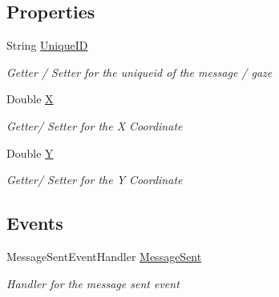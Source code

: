\subsection*{Properties}
\begin{DoxyCompactItemize}
\item 
String \hyperlink{class_web_analyzer_1_1_models_1_1_message_model_1_1_small_data_message_a8ad38d3f87324484d4d9a6ed62656e70}{Unique\+I\+D}
\begin{DoxyCompactList}\small\item\em Getter / Setter for the uniqueid of the message / gaze \end{DoxyCompactList}\item 
Double \hyperlink{class_web_analyzer_1_1_models_1_1_message_model_1_1_small_data_message_a26dce64be8d77b383253876ae2bbd06d}{X}
\begin{DoxyCompactList}\small\item\em Getter/ Setter for the X Coordinate \end{DoxyCompactList}\item 
Double \hyperlink{class_web_analyzer_1_1_models_1_1_message_model_1_1_small_data_message_a4214bf4d6c2c88448e32472cc14f41cd}{Y}
\begin{DoxyCompactList}\small\item\em Getter/ Setter for the Y Coordinate \end{DoxyCompactList}\end{DoxyCompactItemize}
\subsection*{Events}
\begin{DoxyCompactItemize}
\item 
Message\+Sent\+Event\+Handler \hyperlink{class_web_analyzer_1_1_models_1_1_message_model_1_1_small_data_message_a818b24f7d28ba31b0db960023181ed68}{Message\+Sent}
\begin{DoxyCompactList}\small\item\em Handler for the message sent event \end{DoxyCompactList}\end{DoxyCompactItemize}

